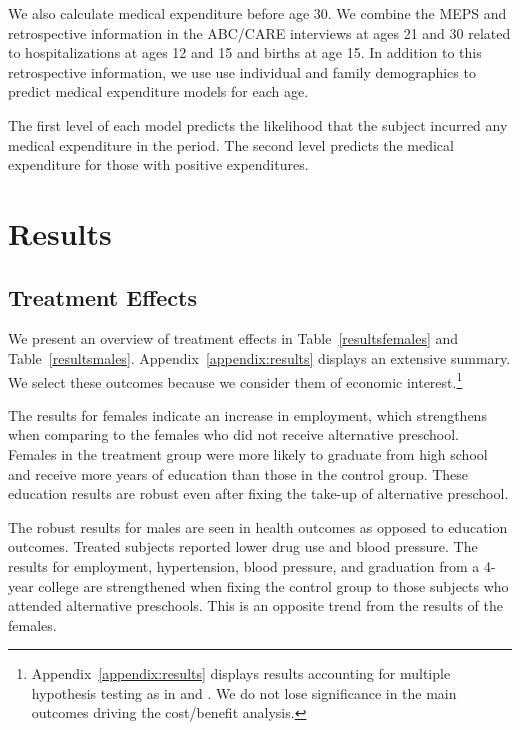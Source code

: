 We also calculate medical expenditure before age 30. We combine the MEPS and retrospective information in the ABC/CARE interviews at ages 21 and 30 related to hospitalizations at ages 12 and 15 and births at age 15. In addition to this retrospective information, we use use individual and family demographics to predict medical expenditure models for each age.

The first level of each model predicts the likelihood that the subject incurred any medical expenditure in the period. The second level predicts the medical expenditure for those with positive expenditures.

\section{Results} \label{section:results}

\subsection{Treatment Effects} \label{section:teresults}

We present an overview of treatment effects in Table~\ref{resultsfemales} and Table~\ref{resultsmales}. Appendix~\ref{appendix:results} displays an extensive summary. We select these outcomes because we consider them of economic interest.\footnote{Appendix~\ref{appendix:results} displays results accounting for multiple hypothesis testing as in \citet{Lehman_Romano_2005_AnnStat} and \citet{Romano_Shaikh_2006_AnnStat}. We do not lose significance in the main outcomes driving the cost/benefit analysis.}

The results for females indicate an increase in employment, which strengthens when comparing to the females who did not receive alternative preschool. Females in the treatment group were more likely to graduate from high school and receive more years of education than those in the control group. These education results are robust even after fixing the take-up of alternative preschool. 

The robust results for males are seen in health outcomes as opposed to education outcomes. Treated subjects reported lower drug use and blood pressure. The results for employment, hypertension, blood pressure, and graduation from a 4-year college are strengthened when fixing the control group to those subjects who attended alternative preschools. This is an opposite trend from the results of the females.

